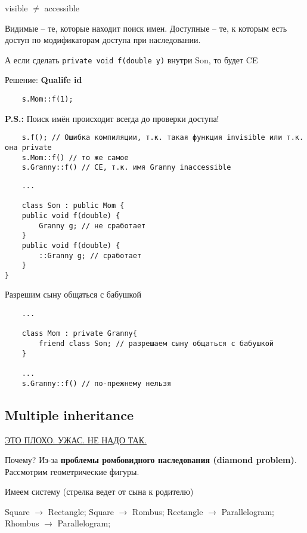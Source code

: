 \documentclass[12pt]{article}
\newcommand{\ps}{\textbf{P.S.: }}
\begin{document}
\begin{center}
visible $\not=$ accessible
\end{center}

Видимые -- те, которые находит поиск имен. 
Доступные -- те, к которым есть доступ по модификаторам доступа при наследовании. 

А если сделать \texttt{private void f(double y)} внутри Son, то будет CE

Решение: \textbf{Qualife id}

\begin{lstlisting}
	s.Mom::f(1);
\end{lstlisting}

\ps Поиск имён происходит всегда до проверки доступа!

\begin{lstlisting}
	s.f(); // Ошибка компиляции, т.к. такая функция invisible или т.к. она private
	s.Mom::f() // то же самое
	s.Granny::f() // CE, т.к. имя Granny inaccessible
\end{lstlisting}

\begin{lstlisting}
	...
	
	class Son : public Mom {
	public void f(double) {
		Granny g; // не сработает
	}
	public void f(double) {
		::Granny g; // сработает
	} 
}
\end{lstlisting}

Разрешим сыну общаться с бабушкой 

\begin{lstlisting}
	...

	class Mom : private Granny{
		friend class Son; // разрешаем сыну общаться с бабушкой
	}
	
	...
	s.Granny::f() // по-прежнему нельзя
\end{lstlisting}
 
\subsection{Multiple inheritance}

\begin{center}
	\underline{ЭТО ПЛОХО. УЖАС. НЕ НАДО ТАК.}
\end{center} 

Почему? Из-за \textbf{проблемы ромбовидного наследования (diamond problem)}. Рассмотрим геометрические фигуры. 

Имеем систему (стрелка ведет от сына к родителю)

\begin{center}
	Square $\rightarrow$ Rectangle; Square $\rightarrow$ Rombus; Rectangle $\rightarrow$ Parallelogram; Rhombus $\rightarrow$ Parallelogram; 
\end{center}
\end{document}
